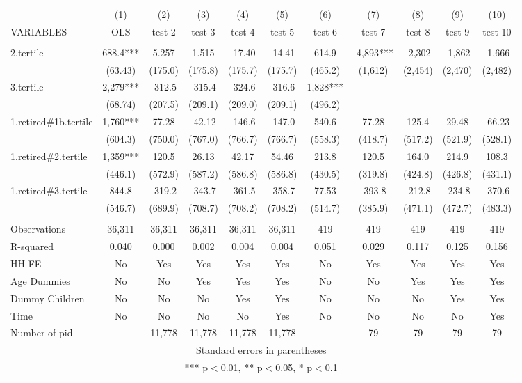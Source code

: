 \begin{tabular}{lcccccccccc} \hline
 & (1) & (2) & (3) & (4) & (5) & (6) & (7) & (8) & (9) & (10) \\
VARIABLES & OLS & test 2 & test 3 & test 4 & test 5 & test 6 & test 7 & test 8 & test 9 & test 10 \\ \hline
 &  &  &  &  &  &  &  &  &  &  \\
2.tertile & 688.4*** & 5.257 & 1.515 & -17.40 & -14.41 & 614.9 & -4,893*** & -2,302 & -1,862 & -1,666 \\
 & (63.43) & (175.0) & (175.8) & (175.7) & (175.7) & (465.2) & (1,612) & (2,454) & (2,470) & (2,482) \\
3.tertile & 2,279*** & -312.5 & -315.4 & -324.6 & -316.6 & 1,828*** &  &  &  &  \\
 & (68.74) & (207.5) & (209.1) & (209.0) & (209.1) & (496.2) &  &  &  &  \\
1.retired\#1b.tertile & 1,760*** & 77.28 & -42.12 & -146.6 & -147.0 & 540.6 & 77.28 & 125.4 & 29.48 & -66.23 \\
 & (604.3) & (750.0) & (767.0) & (766.7) & (766.7) & (558.3) & (418.7) & (517.2) & (521.9) & (528.1) \\
1.retired\#2.tertile & 1,359*** & 120.5 & 26.13 & 42.17 & 54.46 & 213.8 & 120.5 & 164.0 & 214.9 & 108.3 \\
 & (446.1) & (572.9) & (587.2) & (586.8) & (586.8) & (430.5) & (319.8) & (424.8) & (426.8) & (431.1) \\
1.retired\#3.tertile & 844.8 & -319.2 & -343.7 & -361.5 & -358.7 & 77.53 & -393.8 & -212.8 & -234.8 & -370.6 \\
 & (546.7) & (689.9) & (708.7) & (708.2) & (708.2) & (514.7) & (385.9) & (471.1) & (472.7) & (483.3) \\
 &  &  &  &  &  &  &  &  &  &  \\
Observations & 36,311 & 36,311 & 36,311 & 36,311 & 36,311 & 419 & 419 & 419 & 419 & 419 \\
R-squared & 0.040 & 0.000 & 0.002 & 0.004 & 0.004 & 0.051 & 0.029 & 0.117 & 0.125 & 0.156 \\
HH FE & No & Yes & Yes & Yes & Yes & No & Yes & Yes & Yes & Yes \\
Age Dummies & No & No & Yes & Yes & Yes & No & No & Yes & Yes & Yes \\
Dummy Children & No & No & No & Yes & Yes & No & No & No & Yes & Yes \\
Time & No & No & No & No & Yes & No & No & No & No & Yes \\
 Number of pid &  & 11,778 & 11,778 & 11,778 & 11,778 &  & 79 & 79 & 79 & 79 \\ \hline
\multicolumn{11}{c}{ Standard errors in parentheses} \\
\multicolumn{11}{c}{ *** p$<$0.01, ** p$<$0.05, * p$<$0.1} \\
\end{tabular}
